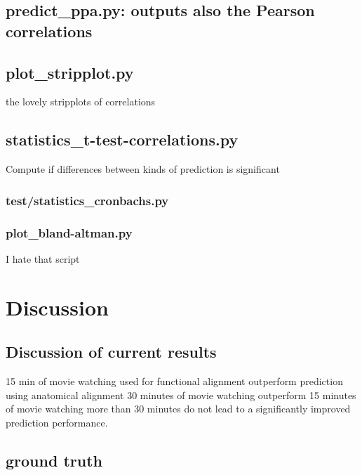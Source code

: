 \subsection{predict\_ppa.py: outputs also the Pearson correlations}


\subsection{plot\_stripplot.py}

the lovely stripplots of correlations

\subsection{statistics\_t-test-correlations.py}

Compute if differences between kinds of prediction is significant


\subsubsection{test/statistics\_cronbachs.py}

\subsubsection{plot\_bland-altman.py}

I hate that script







\section{Discussion}


\subsection{Discussion of current results}
%
15 min of movie watching used for functional alignment outperform prediction
using anatomical alignment
%
30 minutes of movie watching outperform 15 minutes of movie watching
%
more than 30 minutes do not lead to a significantly improved prediction
performance.
%

\subsection{ground truth}

